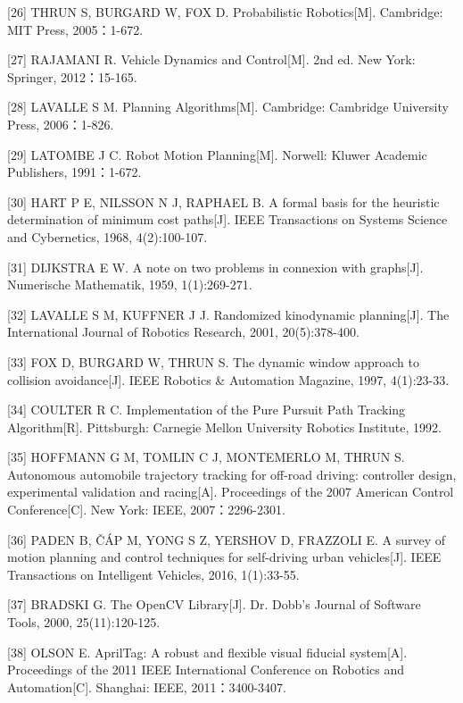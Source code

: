 {[}26{]} THRUN S, BURGARD W, FOX D. Probabilistic Robotics{[}M{]}.
Cambridge: MIT Press, 2005：1-672.

{[}27{]} RAJAMANI R. Vehicle Dynamics and Control{[}M{]}. 2nd ed. New
York: Springer, 2012：15-165.

{[}28{]} LAVALLE S M. Planning Algorithms{[}M{]}. Cambridge: Cambridge
University Press, 2006：1-826.

{[}29{]} LATOMBE J C. Robot Motion Planning{[}M{]}. Norwell: Kluwer
Academic Publishers, 1991：1-672.

{[}30{]} HART P E, NILSSON N J, RAPHAEL B. A formal basis for the
heuristic determination of minimum cost paths{[}J{]}. IEEE Transactions
on Systems Science and Cybernetics, 1968, 4(2):100-107.

{[}31{]} DIJKSTRA E W. A note on two problems in connexion with
graphs{[}J{]}. Numerische Mathematik, 1959, 1(1):269-271.

{[}32{]} LAVALLE S M, KUFFNER J J. Randomized kinodynamic
planning{[}J{]}. The International Journal of Robotics Research, 2001,
20(5):378-400.

{[}33{]} FOX D, BURGARD W, THRUN S. The dynamic window approach to
collision avoidance{[}J{]}. IEEE Robotics \& Automation Magazine, 1997,
4(1):23-33.

{[}34{]} COULTER R C. Implementation of the Pure Pursuit Path Tracking
Algorithm{[}R{]}. Pittsburgh: Carnegie Mellon University Robotics
Institute, 1992.

{[}35{]} HOFFMANN G M, TOMLIN C J, MONTEMERLO M, THRUN S. Autonomous
automobile trajectory tracking for off-road driving: controller design,
experimental validation and racing{[}A{]}. Proceedings of the 2007
American Control Conference{[}C{]}. New York: IEEE, 2007：2296-2301.

{[}36{]} PADEN B, ČÁP M, YONG S Z, YERSHOV D, FRAZZOLI E. A survey of
motion planning and control techniques for self-driving urban
vehicles{[}J{]}. IEEE Transactions on Intelligent Vehicles, 2016,
1(1):33-55.

{[}37{]} BRADSKI G. The OpenCV Library{[}J{]}. Dr. Dobb's Journal of
Software Tools, 2000, 25(11):120-125.

{[}38{]} OLSON E. AprilTag: A robust and flexible visual fiducial
system{[}A{]}. Proceedings of the 2011 IEEE International Conference on
Robotics and Automation{[}C{]}. Shanghai: IEEE, 2011：3400-3407.